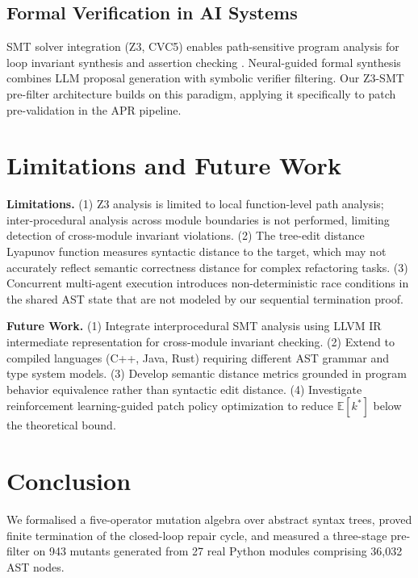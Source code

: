 \documentclass[10pt,twocolumn,letterpaper]{article}
\begin{document}
\subsection{Formal Verification in AI Systems}


SMT solver integration (Z3, CVC5) enables path-sensitive program analysis for loop invariant synthesis and assertion checking \cite{arxiv_2404_01131}. Neural-guided formal synthesis \cite{crossref_10_18653_v1_2026_findings_acl_1933} combines LLM proposal generation with symbolic verifier filtering. Our Z3-SMT pre-filter architecture builds on this paradigm, applying it specifically to patch pre-validation in the APR pipeline.




\section{Limitations and Future Work}


\textbf{Limitations.} (1) Z3 analysis is limited to local function-level path analysis; inter-procedural analysis across module boundaries is not performed, limiting detection of cross-module invariant violations. (2) The tree-edit distance Lyapunov function measures syntactic distance to the target, which may not accurately reflect semantic correctness distance for complex refactoring tasks. (3) Concurrent multi-agent execution introduces non-deterministic race conditions in the shared AST state that are not modeled by our sequential termination proof.

\textbf{Future Work.} (1) Integrate interprocedural SMT analysis using LLVM IR intermediate representation for cross-module invariant checking. (2) Extend to compiled languages (C++, Java, Rust) requiring different AST grammar and type system models. (3) Develop semantic distance metrics grounded in program behavior equivalence rather than syntactic edit distance. (4) Investigate reinforcement learning-guided patch policy optimization to reduce $\mathbb{E}[k^*]$ below the theoretical bound.




\section{Conclusion}


We formalised a five-operator mutation algebra over abstract syntax trees, proved finite termination of the closed-loop repair cycle, and measured a three-stage pre-filter on 943 mutants generated from 27 real Python modules comprising 36{,}032 AST nodes.
\end{document}
